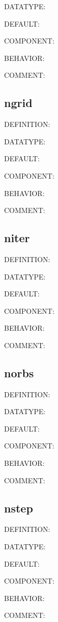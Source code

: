 {\color{green}DATATYPE:}

{\color{blue}DEFAULT:}

{\color{brown}COMPONENT:}

{\color{purple}BEHAVIOR:}

{\color{olive}COMMENT:}

\subsection{ngrid}
{\color{red}DEFINITION:}

{\color{green}DATATYPE:}

{\color{blue}DEFAULT:}

{\color{brown}COMPONENT:}

{\color{purple}BEHAVIOR:}

{\color{olive}COMMENT:}

\subsection{niter}
{\color{red}DEFINITION:}

{\color{green}DATATYPE:}

{\color{blue}DEFAULT:}

{\color{brown}COMPONENT:}

{\color{purple}BEHAVIOR:}

{\color{olive}COMMENT:}

\subsection{norbs}
{\color{red}DEFINITION:}

{\color{green}DATATYPE:}

{\color{blue}DEFAULT:}

{\color{brown}COMPONENT:}

{\color{purple}BEHAVIOR:}

{\color{olive}COMMENT:}

\subsection{nstep}
{\color{red}DEFINITION:}

{\color{green}DATATYPE:}

{\color{blue}DEFAULT:}

{\color{brown}COMPONENT:}

{\color{purple}BEHAVIOR:}

{\color{olive}COMMENT:}

